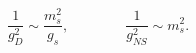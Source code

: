 \begin{equation}
\frac{1}{g_{D}^2}\sim \frac{m_s^2}{g_s},\qquad\qquad \frac{1}{g_{NS}^2}\sim m_s^2.
\end{equation}

